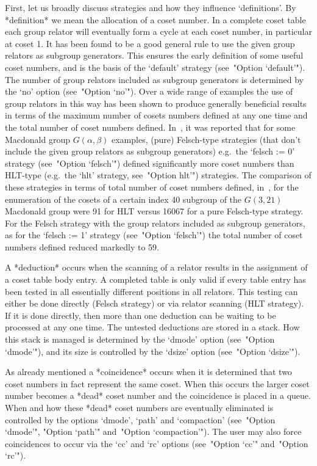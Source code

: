 First, let us  broadly  discuss  strategies  and  how  they  influence
\lq{}definitions'. By *definition* we mean the allocation of  a  coset
number. In a complete coset table each group relator  will  eventually
form a cycle at each coset number, in particular at coset  1.  It  has
been found to be a good general rule to use the given  group  relators
as subgroup generators. This ensures  the  early  definition  of  some
useful coset numbers, and is  the  basis  of  the  `default'  strategy
(see~"Option `default'"). The number of  group  relators  included  as
subgroup generators is determined  by  the  `no'  option  (see~"Option
`no'"). Over a wide range of examples the use  of  group  relators  in
this way has been shown to produce  generally  beneficial  results  in
terms of the maximum number of cosets numbers defined at any one  time
and the total number of coset numbers  defined.  In~\cite{CDHW73},  it
was reported that for some Macdonald group $G(\alpha,\beta)$ examples,
(pure) Felsch-type strategies (that  don't  include  the  given  group
relators as subgroup  generators)  e.g.~the  `felsch  :=  0'  strategy
(see~"Option `felsch'") defined significantly more coset numbers  than
HLT-type (e.g.~the `hlt' strategy, see~"Option hlt'") strategies.  The
comparison of these strategies in  terms  of  total  number  of  coset
numbers defined, in~\cite{Hav91}, for the enumeration of the cosets of
a certain index 40 subgroup of the $G(3,21)$ Macdonald group  were  91
for HLT versus 16067 for a pure Felsch-type strategy. For  the  Felsch
strategy with the group relators included as subgroup  generators,  as
for the `felsch :=  1'  strategy  (see~"Option  `felsch'")  the  total
number of coset numbers defined reduced markedly to 59.

A *deduction* occurs when the scanning of a  relator  results  in  the
assignment of a coset table body entry.  A  completed  table  is  only
valid if  every  table  entry  has  been  tested  in  all  essentially
different positions in all relators. This testing can either  be  done
directly (Felsch strategy) or via relator scanning (HLT strategy).  If
it is done directly, then more than one deduction can be waiting to be
processed at any one time. The untested deductions  are  stored  in  a
stack. How this stack is managed is determined by the  `dmode'  option
(see~"Option `dmode'"), and its size  is  controlled  by  the  `dsize'
option (see~"Option `dsize'").

As already mentioned a *coincidence* occurs when it is determined that
two coset numbers in fact represent the same coset. When  this  occurs
the larger  coset  number  becomes  a  *dead*  coset  number  and  the
coincidence is placed in a queue. When  and  how  these  *dead*  coset
numbers  are  eventually  eliminated  is  controlled  by  the  options
`dmode',  `path'  and  `compaction'  (see~"Option  `dmode'",   "Option
`path'"  and~"Option  `compaction'").  The   user   may   also   force
coincidences to occur via the `cc' and `rc' options (see~"Option `cc'"
and~"Option `rc'").

